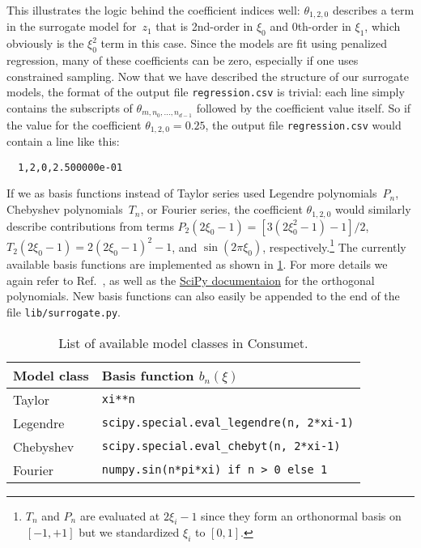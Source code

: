 \documentclass[a4paper,bibliography=numbered]{scrartcl}
\begin{document}
This illustrates the logic behind the coefficient indices well: $\theta_{1,2,0}$ describes a term in the surrogate model for~$z_1$ that is 2nd-order in $\xi_0$ and 0th-order in $\xi_1$, which obviously is the $\xi_0^2$ term in this case.
Since the models are fit using penalized regression, many of these coefficients can be zero, especially if one uses constrained sampling.
Now that we have described the structure of our surrogate models, the format of the output file \texttt{regression.csv} is trivial: each line simply contains the subscripts of $\theta_{m,n_0,\ldots,n_{d-1}}$ followed by the coefficient value itself.
So if the value for the coefficient $\theta_{1,2,0} = 0.25$, the output file \texttt{regression.csv} would contain a line like this:
\begin{lstlisting}
  1,2,0,2.500000e-01
\end{lstlisting}

If we as basis functions instead of Taylor series used Legendre polynomials~$P_n$, Chebyshev polynomials~$T_n$, or Fourier series, the coefficient $\theta_{1,2,0}$ would similarly describe contributions from terms $P_2(2\xi_0-1) = [3(2\xi^2_0-1)-1]/2$, $T_2(2\xi_0-1) = 2(2\xi_0-1)^2-1$, and $\sin(2\pi \xi_0)$, respectively.\footnote{$T_n$ and $P_n$ are evaluated at $2\xi_i-1$ since they form an orthonormal basis on $[-1,+1]$ but we standardized $\xi_i$ to $[0,1]$.}
The currently available basis functions are implemented as shown in \cref{tab:modelclass}.
For more details we again refer to Ref.~\cite{TechPaper}, as well as the \href{https://docs.scipy.org/doc/scipy/reference/special.html}{SciPy documentaion} for the orthogonal polynomials.
New basis functions can also easily be appended to the end of the file \texttt{lib/surrogate.py}.
\begin{table}[h!]
	\begin{center}
	\caption{List of available model classes in Consumet.}
	\label{tab:modelclass}
	\begin{tabular}{ll}
		\toprule
		Model class     &	Basis function $b_n(\xi)$ \\
		\midrule
		Taylor			&	\texttt{xi**n} \\
		Legendre		&	\texttt{scipy.special.eval\_legendre(n, 2*xi-1)} \\
		Chebyshev		&	\texttt{scipy.special.eval\_chebyt(n, 2*xi-1)} \\
		Fourier			&	\texttt{numpy.sin(n*pi*xi) if n > 0 else 1} \\
		\bottomrule
	\end{tabular}
	\end{center}
	\vspace{-3ex}
\end{table}
\end{document}
